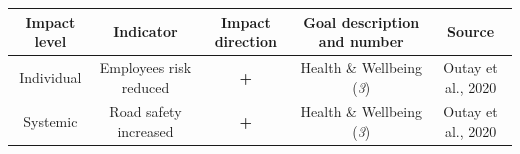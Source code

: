 \documentclass[
]{book}
\begin{document}
\begin{longtable}[]{@{}ccccc@{}}
\toprule
\begin{minipage}[b]{0.17\columnwidth}\centering
Impact level\strut
\end{minipage} & \begin{minipage}[b]{0.16\columnwidth}\centering
Indicator\strut
\end{minipage} & \begin{minipage}[b]{0.17\columnwidth}\centering
Impact direction\strut
\end{minipage} & \begin{minipage}[b]{0.17\columnwidth}\centering
Goal description and number\strut
\end{minipage} & \begin{minipage}[b]{0.17\columnwidth}\centering
Source\strut
\end{minipage}\tabularnewline
\midrule
\endhead
\begin{minipage}[t]{0.17\columnwidth}\centering
Individual\strut
\end{minipage} & \begin{minipage}[t]{0.16\columnwidth}\centering
Employees risk reduced\strut
\end{minipage} & \begin{minipage}[t]{0.17\columnwidth}\centering
\textbf{+}\strut
\end{minipage} & \begin{minipage}[t]{0.17\columnwidth}\centering
Health \& Wellbeing (\emph{3})\strut
\end{minipage} & \begin{minipage}[t]{0.17\columnwidth}\centering
Outay et al., 2020\strut
\end{minipage}\tabularnewline
\begin{minipage}[t]{0.17\columnwidth}\centering
Systemic\strut
\end{minipage} & \begin{minipage}[t]{0.16\columnwidth}\centering
Road safety increased\strut
\end{minipage} & \begin{minipage}[t]{0.17\columnwidth}\centering
\textbf{+}\strut
\end{minipage} & \begin{minipage}[t]{0.17\columnwidth}\centering
Health \& Wellbeing (\emph{3})\strut
\end{minipage} & \begin{minipage}[t]{0.17\columnwidth}\centering
Outay et al., 2020\strut
\end{minipage}\tabularnewline

\end{longtable}
\end{document}
